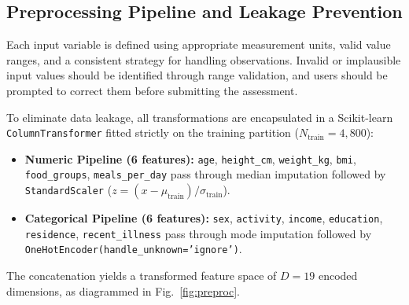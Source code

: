 \documentclass[conference]{IEEEtran}
\begin{document}
\begin{table}[!t]
\caption{Feature Groups, Project Inputs, and Processing Steps}
\label{tab:features}
\centering
{}
\end{table}

\subsection{Preprocessing Pipeline and Leakage Prevention}
Each input variable is defined using appropriate measurement units, valid value ranges, and a consistent strategy for handling observations. Invalid or implausible input values should be identified through range validation, and users should be prompted to correct them before submitting the assessment. 

To eliminate data leakage, all transformations are encapsulated in a Scikit-learn \texttt{ColumnTransformer} fitted strictly on the training partition ($N_{\text{train}} = 4{,}800$):
\begin{itemize}
    \item \textbf{Numeric Pipeline (6 features):} \texttt{age}, \texttt{height\_cm}, \texttt{weight\_kg}, \texttt{bmi}, \texttt{food\_groups}, \texttt{meals\_per\_day} pass through median imputation followed by \texttt{StandardScaler} ($z = (x - \mu_{\text{train}}) / \sigma_{\text{train}}$).
    \item \textbf{Categorical Pipeline (6 features):} \texttt{sex}, \texttt{activity}, \texttt{income}, \texttt{education}, \texttt{residence}, \texttt{recent\_illness} pass through mode imputation followed by \texttt{OneHotEncoder(handle\_unknown='ignore')}.
\end{itemize}
The concatenation yields a transformed feature space of $D = 19$ encoded dimensions, as diagrammed in Fig.~\ref{fig:preproc}.
\end{document}
